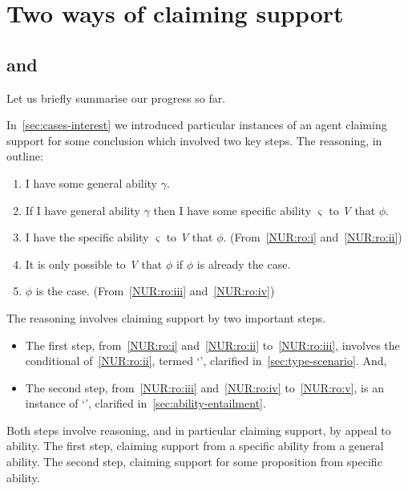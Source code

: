 \chapter{Two ways of claiming support}
\label{sec:two-ways-of-claiming-support}

\section{\adA{} and \adB{}}
\label{sec:ability-ads-adc}

\begin{note}
  Let us briefly summarise our progress so far.

  In~\autoref{sec:cases-interest} we introduced particular instances of an agent claiming support for some conclusion which involved two key steps.
  The reasoning, in outline:
  \begin{enumerate}[label=\arabic*., ref=(\arabic*)]
  \item\label{NUR:ro:i} I have some general ability \(\gamma\).
  \item\label{NUR:ro:ii} If I have general ability \(\gamma\) then I have some specific ability \(\varsigma\) to \emph{V} that \(\phi\).
  \item\label{NUR:ro:iii} I have the specific ability \(\varsigma\) to \emph{V} that \(\phi\). \hfill (From~\ref{NUR:ro:i} and~\ref{NUR:ro:ii})
  \item\label{NUR:ro:iv} It is only possible to \emph{V} that \(\phi\) if \(\phi\) is already the case.
  \item\label{NUR:ro:v} \(\phi\) is the case. \hfill (From~\ref{NUR:ro:iii} and~\ref{NUR:ro:iv})
  \end{enumerate}

  The reasoning involves claiming support by two important steps.

  \begin{itemize}
  \item The first step, from~\ref{NUR:ro:i} and~\ref{NUR:ro:ii} to~\ref{NUR:ro:iii}, involves the conditional of~\ref{NUR:ro:ii}, termed `', clarified in~\autoref{sec:type-scenario}. And,
  \item The second step, from~\ref{NUR:ro:iii} and~\ref{NUR:ro:iv} to~\ref{NUR:ro:v}, is an instance of `', clarified in~\autoref{sec:ability-entailment}.
  \end{itemize}

  Both steps involve reasoning, and in particular claiming support, by appeal to ability.
  The first step, claiming support from a specific ability from a general ability.
  The second step, claiming support for some proposition from specific ability.


\end{note}
